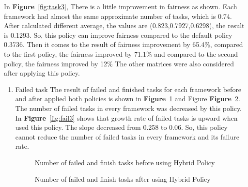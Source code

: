 \documentclass[12pt,oneside,openright,a4paper]{cpe-english-project}
\begin{document}
\hspace{10mm}In \textbf{Figure}~\ref{fig:task3}, There is a little improvement in fairness as shown. Each framework had almost the same approximate number of tasks, which is 0.74. After calculated different average, the values are (0.823,0.7927,0.6298), the result is 0.1293. So, this policy can improve fairness compared to the default policy 0.3736. Then it comes to the result of fairness improvement by 65.4\%, compared to the first policy, the fairness improved by 71.1\% and compared to the second policy, the fairness improved by 12\%
\newline
The other matrices were also considered after applying this policy.
\begin{enumerate}
  \item Failed task
  \newline
  The result of failed and finished tasks for each framework before and after applied both policies is shown in  \textbf{Figure}~\ref{fig:finfail0-3} and Figure \textbf{Figure}~\ref{fig:finfail3}. The number of failed tasks in every framework was decreased by this policy. In \textbf{Figure}~\ref{fig:fail3} shows that growth rate of failed tasks is upward when used this policy. The slope decreased from 0.258 to 0.06. So, this policy cannot reduce the number of failed tasks in every framework and its failure rate.
  \begin{figure}[!h]\centering
    \setlength{\fboxrule}{0mm} %
    \setlength{\fboxsep}{0cm}
    \caption{Number of failed and finish tasks before using Hybrid Policy}\label{fig:finfail0-3}
\end{figure}
\begin{figure}[!h]\centering
    \setlength{\fboxrule}{0mm} %
    \setlength{\fboxsep}{0cm}
    \caption{Number of failed and finish tasks after using Hybrid Policy}\label{fig:finfail3}

\end{figure}
\end{enumerate}
\end{document}
